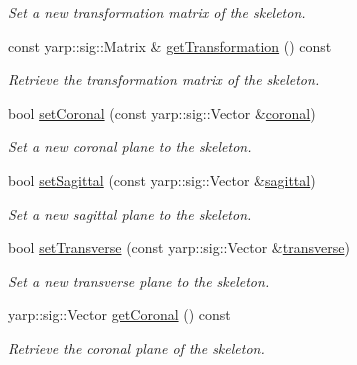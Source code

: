 \begin{DoxyCompactItemize}
\begin{DoxyCompactList}\small\item\em Set a new transformation matrix of the skeleton. \end{DoxyCompactList}\item 
const yarp\+::sig\+::\+Matrix \& \mbox{\hyperlink{classassistive__rehab_1_1Skeleton_a2bdcc0d686a5a232aa2c07528cf2e647}{get\+Transformation}} () const
\begin{DoxyCompactList}\small\item\em Retrieve the transformation matrix of the skeleton. \end{DoxyCompactList}\item 
bool \mbox{\hyperlink{classassistive__rehab_1_1Skeleton_ab3bd697f48ea69cfdc5ff7574c19041f}{set\+Coronal}} (const yarp\+::sig\+::\+Vector \&\mbox{\hyperlink{classassistive__rehab_1_1Skeleton_ad042a7e60e6d72cc87b06c5fb0bdfae2}{coronal}})
\begin{DoxyCompactList}\small\item\em Set a new coronal plane to the skeleton. \end{DoxyCompactList}\item 
bool \mbox{\hyperlink{classassistive__rehab_1_1Skeleton_af92fdb0e3eb88a0b1dedd5038e2c6eb7}{set\+Sagittal}} (const yarp\+::sig\+::\+Vector \&\mbox{\hyperlink{classassistive__rehab_1_1Skeleton_a72d6ccb619619e77a17258b08496a972}{sagittal}})
\begin{DoxyCompactList}\small\item\em Set a new sagittal plane to the skeleton. \end{DoxyCompactList}\item 
bool \mbox{\hyperlink{classassistive__rehab_1_1Skeleton_a1aeba05a17363afc08c30397d17375df}{set\+Transverse}} (const yarp\+::sig\+::\+Vector \&\mbox{\hyperlink{classassistive__rehab_1_1Skeleton_ab8a9bf9297f520e8de801248e0b8d2dd}{transverse}})
\begin{DoxyCompactList}\small\item\em Set a new transverse plane to the skeleton. \end{DoxyCompactList}\item 
yarp\+::sig\+::\+Vector \mbox{\hyperlink{classassistive__rehab_1_1Skeleton_aa241a0ac93a9ead198f985073c8935eb}{get\+Coronal}} () const
\begin{DoxyCompactList}\small\item\em Retrieve the coronal plane of the skeleton. \end{DoxyCompactList}\item 

\end{DoxyCompactItemize}
